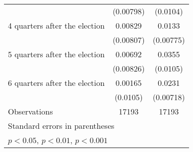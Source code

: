 \begin{table}[htbp]
\begin{tabular}{l*{2}{c}}
                    &   (0.00798)         &    (0.0104)         \\
[1em]
 4 quarters after the election&     0.00829         &      0.0133         \\
                    &   (0.00807)         &   (0.00775)         \\
[1em]
 5 quarters after the election&     0.00692         &      0.0355\sym{***}\\
                    &   (0.00826)         &    (0.0105)         \\
[1em]
 6 quarters after the election&     0.00165         &      0.0231\sym{**} \\
                    &    (0.0105)         &   (0.00718)         \\
\hline
Observations        &       17193         &       17193         \\
\hline\hline
\multicolumn{3}{l}{\footnotesize Standard errors in parentheses}\\
\multicolumn{3}{l}{\footnotesize \sym{*} \(p<0.05\), \sym{**} \(p<0.01\), \sym{***} \(p<0.001\)}\\
\end{tabular}
\end{table}
